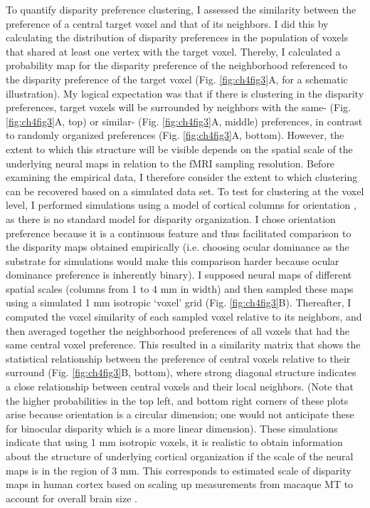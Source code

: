 To quantify disparity preference clustering, I assessed the similarity between the preference of a central target voxel and that of its neighbors. I did this by calculating the distribution of disparity preferences in the population of voxels that shared at least one vertex with the target voxel. Thereby, I calculated a probability map for the disparity preference of the neighborhood referenced to the disparity preference of the target voxel (Fig. \ref{fig:ch4fig3}A, for a schematic illustration). My logical expectation was that if there is clustering in the disparity preferences, target voxels will be surrounded by neighbors with the same- (Fig. \ref{fig:ch4fig3}A, top) or similar- (Fig. \ref{fig:ch4fig3}A, middle) preferences, in contrast to randomly organized preferences (Fig. \ref{fig:ch4fig3}A, bottom). However, the extent to which this structure will be visible depends on the spatial scale of the underlying neural maps in relation to the fMRI sampling resolution. Before examining the empirical data, I therefore consider the extent to which clustering can be recovered based on a simulated data set.
To test for clustering at the voxel level, I performed simulations using a model of cortical columns for orientation \cite{ROJER:1990bq}, as there is no standard model for disparity organization. I chose orientation preference because it is a continuous feature and thus facilitated comparison to the disparity maps obtained empirically (i.e. choosing ocular dominance as the substrate for simulations would make this comparison harder because ocular dominance preference is inherently binary). I supposed neural maps of different spatial scales (columns from 1 to 4 mm in width) and then sampled these maps using a simulated 1 mm isotropic `voxel' grid (Fig. \ref{fig:ch4fig3}B). Thereafter, I computed the voxel similarity of each sampled voxel relative to its neighbors, and then averaged together the neighborhood preferences of all voxels that had the same central voxel preference. This resulted in a similarity matrix that shows the statistical relationship between the preference of central voxels relative to their surround (Fig. \ref{fig:ch4fig3}B, bottom), where strong diagonal structure indicates a close relationship between central voxels and their local neighbors. (Note that the higher probabilities in the top left, and bottom right corners of these plots arise because orientation is a circular dimension; one would not anticipate these for binocular disparity which is a more linear dimension). These simulations indicate that using 1 mm isotropic voxels, it is realistic to obtain information about the structure of underlying cortical organization if the scale of the neural maps is in the region of 3 mm. This corresponds to estimated scale of disparity maps in human cortex based on scaling up measurements from macaque MT to account for overall brain size \cite{DeAngelis:1999fk,Ban:2012jr}.
